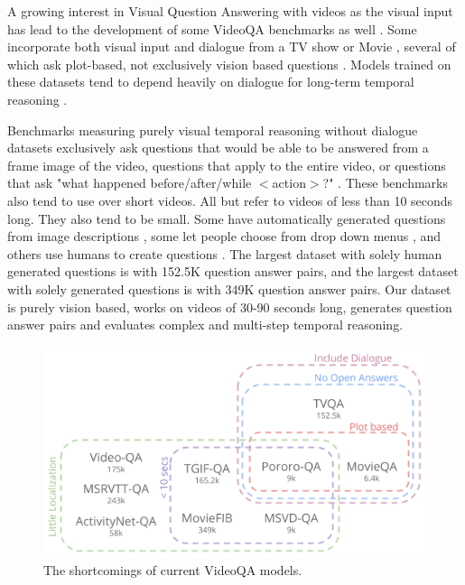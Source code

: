 \documentclass[10pt,twocolumn,letterpaper]{article}
\newcommand{\mgm}[1]{{\color{cyan}{mgm: #1}}}
\begin{document}
\mgm{how to include new information here without being too repetitive with the introduction?}

A growing interest in Visual Question Answering with videos as the visual input has lead to the development of some VideoQA benchmarks as well \cite{tapaswi2016movieqa, lei2018tvqa, jang2017tgif, kim2017deepstory, xu2017video, maharaj2017dataset, zeng2016leveraging, yu2019activitynet}. Some incorporate both visual input and dialogue from a TV show or Movie \cite{tapaswi2016movieqa, lei2018tvqa, kim2017deepstory}, several of which ask plot-based, not exclusively vision based questions \cite{tapaswi2016movieqa, kim2017deepstory}. Models trained on these datasets tend to depend heavily on dialogue for long-term temporal reasoning \cite{tapaswi2016movieqa, lei2018tvqa}. 

Benchmarks measuring purely visual temporal reasoning without dialogue datasets exclusively ask questions that would be able to be answered from a frame image of the video,  questions that apply to the entire video, or questions that ask "what happened before/after/while $<$action$>$?" \mgm{is there a better way to explain this type of question?}. These benchmarks also tend to use over short videos. All but \cite{yu2019activitynet, xu2017video} refer to videos of less than 10 seconds long. They also tend to be small. Some have automatically generated questions from image descriptions \cite{xu2017video,zeng2016leveraging}, some let people choose from drop down menus \cite{tgif}, and others use humans to create questions \cite{yu2019activitynet, tapaswi2016movieqa, jang2017tgif, lei2018tvqa}. The largest dataset with solely human generated questions is \cite{lei2018tvqa} with 152.5K question answer pairs, and the largest dataset with solely generated questions is \cite{maharaj2017dataset} with 349K question answer pairs. \mgm{add in figure VG slide 5, and table.} Our dataset is purely vision based, works on videos of 30-90 seconds long, generates \mgm{add here} question answer pairs and evaluates complex and multi-step temporal reasoning.

\begin{figure}[t]
\begin{center}
\includegraphics[width=0.8\linewidth]{figure_videoQA.png}
\end{center}
   \caption{The shortcomings of current VideoQA models.}
\label{fig:long}
\label{fig:onecol}
\end{figure}
\end{document}
